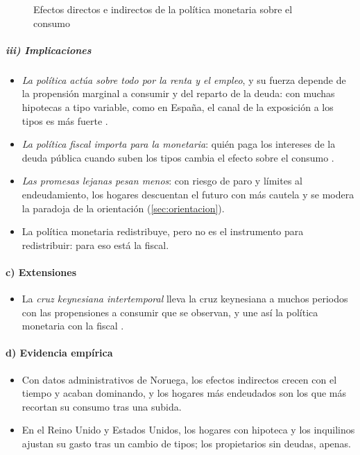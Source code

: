 \documentclass[11pt]{article}
\begin{document}
\begin{figure}[H]
\centering
\caption{Efectos directos e indirectos de la política monetaria sobre el consumo}\label{fig:hank-efectos}
\end{figure}

\subparagraph{iii) Implicaciones}
\begin{itemize}
\item \emph{La política actúa sobre todo por la renta y el empleo}, y su fuerza depende de la propensión marginal a consumir y del reparto de la deuda: con muchas hipotecas a tipo variable, como en España, el canal de la exposición a los tipos es más fuerte .
\item \emph{La política fiscal importa para la monetaria}: quién paga los intereses de la deuda pública cuando suben los tipos cambia el efecto sobre el consumo .
\item \emph{Las promesas lejanas pesan menos}: con riesgo de paro y límites al endeudamiento, los hogares descuentan el futuro con más cautela y se modera la paradoja de la orientación\nocite{McKayNakamuraSteinsson2016} (\ref{sec:orientacion}).
\item La política monetaria redistribuye, pero no es el instrumento para redistribuir: para eso está la fiscal.
\end{itemize}

\paragraph{c) Extensiones}
\begin{itemize}
\item La \emph{cruz keynesiana intertemporal} lleva la cruz keynesiana a muchos periodos con las propensiones a consumir que se observan, y une así la política monetaria con la fiscal\nocite{AuclertRognlieStraub2024} .
\end{itemize}

\paragraph{d) Evidencia empírica}
\begin{itemize}
\item Con datos administrativos de Noruega, los efectos indirectos crecen con el tiempo y acaban dominando, y los hogares más endeudados son los que más recortan su consumo tras una subida\nocite{HolmPaulTischbirek2021Transmission}.
\item En el Reino Unido y Estados Unidos, los hogares con hipoteca y los inquilinos ajustan su gasto tras un cambio de tipos; los propietarios sin deudas, apenas\nocite{CloyneFerreiraSurico2020Monetary}.
\end{itemize}
\end{document}
